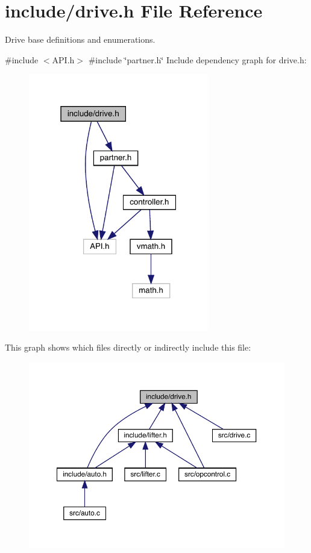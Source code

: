 \section{include/drive.h File Reference}
\label{drive_8h}


Drive base definitions and enumerations.  


{\ttfamily \#include $<$A\+P\+I.\+h$>$}\newline
{\ttfamily \#include \char`\"{}partner.\+h\char`\"{}}\newline
Include dependency graph for drive.\+h\+:
\nopagebreak
\begin{figure}[H]
\begin{center}
\leavevmode
\includegraphics[width=223pt]{drive_8h__incl}
\end{center}
\end{figure}
This graph shows which files directly or indirectly include this file\+:
\nopagebreak
\begin{figure}[H]
\begin{center}
\leavevmode
\includegraphics[width=350pt]{drive_8h__dep__incl}
\end{center}
\end{figure}
